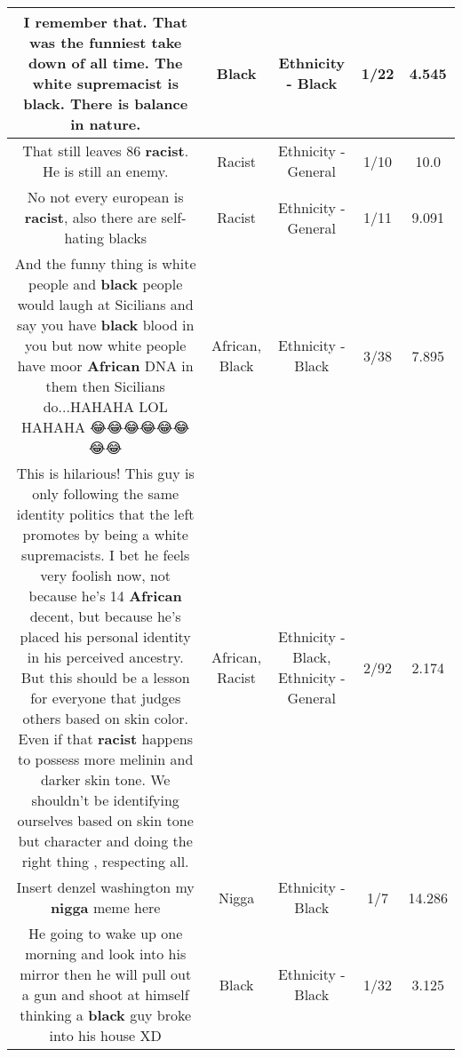\documentclass[11pt]{article}
\newlength\mylength
\begin{document}
\begin{center}
\begin{longtable}{|C{.65\mylength}|C{.30\mylength}|C{.12\mylength}|C{.12\mylength}|C{.12\mylength}|}
  \small I remember that. That was the funniest take down of all time. The white supremacist is \textbf{black}. There is balance in nature.\normalsize   & Black & Ethnicity - Black & 1/22 & 4.545 \\  \hline
  \small That still leaves 86 \textbf{racist}. He is still an enemy.\normalsize   & Racist & Ethnicity - General & 1/10 & 10.0 \\  \hline
  \small No not every european is \textbf{racist}, also there are self-hating blacks\normalsize   & Racist & Ethnicity - General & 1/11 & 9.091 \\  \hline
  \small And the funny thing is white people and \textbf{black} people would laugh at Sicilians and say you have \textbf{black} blood in you but now white people have moor \textbf{African} DNA in them then Sicilians do...HAHAHA LOL HAHAHA 😂😂😂😂😂😂😂😂\normalsize   & African, Black & Ethnicity - Black & 3/38 & 7.895 \\  \hline
  \small This is hilarious! This guy is only following the same identity politics that the left promotes by being a white supremacists. I bet he feels very foolish now, not because he's 14 \textbf{African} decent, but because he's placed his personal identity in his perceived ancestry. But this should be a lesson for everyone that judges others based on skin color. Even if that \textbf{racist} happens to possess more melinin and darker skin tone. We shouldn't be identifying ourselves based on skin tone but character and doing the right thing , respecting all.\normalsize   & African, Racist & Ethnicity - Black, Ethnicity - General & 2/92 & 2.174 \\  \hline
  \small Insert denzel washington my \textbf{nigga} meme here\normalsize   & Nigga & Ethnicity - Black & 1/7 & 14.286 \\  \hline
  \small He going to wake up one morning and look into his mirror then he will pull out a gun and shoot at himself thinking a \textbf{black} guy broke into his house XD\normalsize   & Black & Ethnicity - Black & 1/32 & 3.125 \\  \hline

\end{longtable}
\end{center}
\end{document}
